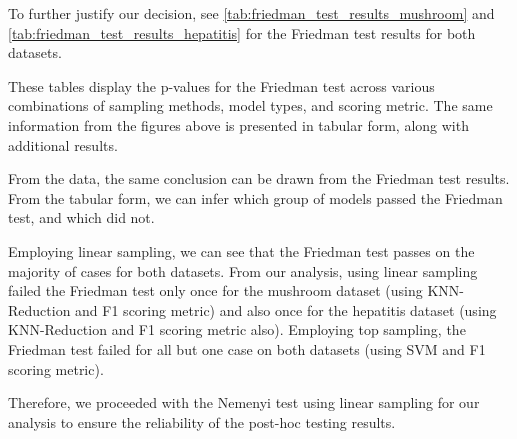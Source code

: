 To further justify our decision, see \autoref{tab:friedman_test_results_mushroom} and \autoref{tab:friedman_test_results_hepatitis} for the Friedman test results for both datasets.




These tables display the p-values for the Friedman test across various combinations
of sampling methods, model types, and scoring metric. The same information from the figures 
above is presented in tabular form, along with additional results.

From the data, the same conclusion can be drawn from the Friedman test results.
From the tabular form, we can infer which group of models passed the Friedman test, and which did not.

Employing linear sampling, we can see that the Friedman test passes on the majority
of cases for both datasets. From our analysis, using linear sampling failed the Friedman test
only once for the mushroom dataset (using KNN-Reduction and F1 scoring metric) and also once
for the hepatitis dataset (using KNN-Reduction and F1 scoring metric also). Employing top sampling,
the Friedman test failed for all but one case on both datasets (using SVM and F1 scoring metric).

Therefore, we proceeded with the Nemenyi test using linear sampling for our analysis to
ensure the reliability of the post-hoc testing results.
